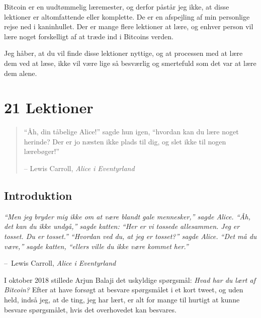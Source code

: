 \documentclass[paper=6in:9in,pagesize=pdftex,
               headinclude=on,footinclude=on,12pt]{scrbook}
\makeatletter
\newenvironment{chapquote}[2][4em]{\setlength{\@tempdima}{#1}%
   \def\chapquote@author{#2}%
   \parshape 1 \@tempdima \dimexpr\textwidth-2\@tempdima\relax%
   \itshape}{\par\normalfont\hfill--\ \chapquote@author\hspace*{\@tempdima}\par\bigskip}
\makeatother
\begin{document}
Bitcoin er en uudtømmelig læremester, og derfor påstår jeg ikke, at disse lektioner er altomfattende eller komplette. De er en afspejling af min personlige rejse ned i kaninhullet. Der er mange flere lektioner at lære, og enhver person vil lære noget forskelligt af at træde ind i Bitcoins verden.

Jeg håber, at du vil finde disse lektioner nyttige, og at processen med at lære dem ved at læse, ikke vil være lige så besværlig og smertefuld som det var at lære dem alene.%

\mainmatter

\part*{21 Lektioner}

\newpage \vspace*{8cm}
\thispagestyle{empty}
\begin{quotation}
\begin{center}
  \large \enquote{Åh, din tåbelige Alice!} sagde hun igen, \enquote{hvordan kan du lære noget herinde? Der er jo næsten ikke plads til dig, og slet ikke til nogen lærebøger!} \end{center}
\begin{flushright} -- Lewis Carroll, \textit{Alice i Eventyrland}\end{flushright}
\end{quotation}

\chapter*{Introduktion}
\label{ch:introduction}

\begin{chapquote}{Lewis Carroll, \textit{Alice i Eventyrland}} \enquote{Men jeg bryder mig ikke om at være blandt gale mennesker,} sagde Alice. \enquote{Åh, det kan du ikke undgå,} sagde katten: \enquote{Her er vi tossede allesammen. Jeg er tosset. Du er tosset.} \enquote{Hvordan ved du, at jeg er tosset?} sagde Alice. \enquote{Det må du være,} sagde katten, \enquote{ellers ville du ikke være kommet her.} \end{chapquote}

I oktober 2018 stillede Arjun Balaji det uskyldige spørgsmål: \textit{Hvad har du lært af Bitcoin?} Efter at have forsøgt at besvare spørgsmålet i et kort tweet, og uden held, indså jeg, at de ting, jeg har lært, er alt for mange til hurtigt at kunne besvare spørgsmålet, hvis det overhovedet kan besvares.
\end{document}

